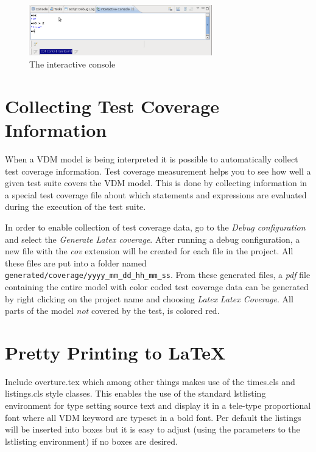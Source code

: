 \documentclass{overturerep}
\begin{document}
{\begin{figure}[htp]
\begin{center}
  \includegraphics[width=300px]{figures/InteractiveConsole}
  \caption{The interactive console}
  \label{fig:userguide:interactiveConsole}
\end{center}
\end{figure}

\section{Collecting Test Coverage Information}\label{sec:testcoverage}

When a VDM model is being interpreted it is possible to automatically
collect test coverage information. 
Test coverage measurement helps you to see
how well a given test suite covers the
VDM model. This is done by collecting information in a special
test coverage file about which statements and expressions are
evaluated during the execution of the test suite.

In order to enable collection of test coverage data, go to the \emph{Debug 
configuration} and select the \emph{Generate Latex coverage}. After running a 
debug configuration, a new file with the \emph{cov} extension will be created for 
each file in the project. All these files are put into a folder named
\texttt{generated/coverage/yyyy_mm_dd_hh_mm_ss}. From these generated files,
a \emph{pdf} file containing the entire model with color coded test coverage data 
can be generated by right clicking on the project name and choosing
\emph{Latex} \rightarrow \emph{Latex Coverage}. All parts of the model \emph{not}
covered by the test, is colored red.


\section{Pretty Printing to \LaTeX}\label{sec:prettyprint}

Include {\ttfamily overture.tex} which among other things makes use of
the {\ttfamily times.cls} and {\ttfamily listings.cls} style
classes. This enables the use of the standard {\ttfamily lstlisting}
environment for type setting source text and display it in a tele-type
proportional font where all VDM keyword are typeset in a bold
font. Per default the listings will be inserted into boxes but it is
easy to adjust (using the parameters to the {\ttfamily lstlisting}
environment) if no boxes are desired.

}
\end{document}
